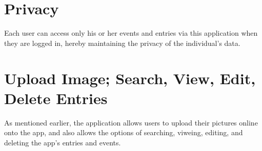 \documentclass[11pt]{article}
\begin{document}
 \section{Privacy}
Each user can access only his or her events and entries via this application when they are logged in, hereby maintaining the privacy of the individual's data.

\section{Upload Image; Search, View, Edit, Delete Entries }
As mentioned earlier, the application allows users to upload their pictures online onto the app, and also allows the options of searching, viweing, editing, and deleting the app's entries and events. 

 
 
\end{document}
